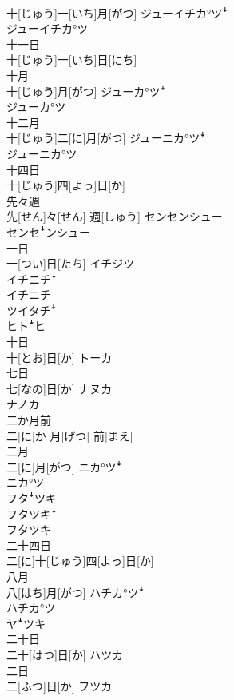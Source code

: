 \documentclass[8pt]{extreport}
\begin{document}
\begin{CJK}{UTF8}{min}
\\	十[じゅう]一[いち]月[がつ]	ジューイチカ°ツꜜ 
\\	ジューイチカ°ツ
\\	十一日	
\\	十[じゅう]一[いち]日[にち]	
\\	十月	
\\	十[じゅう]月[がつ]	ジューカ°ツꜜ 
\\	ジューカ°ツ
\\	十二月	
\\	十[じゅう]二[に]月[がつ]	ジューニカ°ツꜜ 
\\	ジューニカ°ツ
\\	十四日	
\\	十[じゅう]四[よっ]日[か]	
\\	先々週	
\\	先[せん]々[せん] 週[しゅう]	センセンシュー 
\\	センセꜜンシュー
\\	一日	
\\	一[つい]日[たち]	イチジツ 
\\	イチニチꜜ 
\\	イチニチ 
\\	ツイタチꜜ 
\\	ヒトꜜヒ
\\	十日	
\\	十[とお]日[か]	トーカ
\\	七日	
\\	七[なの]日[か]	ナヌカ 
\\	ナノカ
\\	二か月前	
\\	二[に]か 月[げつ] 前[まえ]	
\\	二月	
\\	二[に]月[がつ]	ニカ°ツꜜ 
\\	ニカ°ツ 
\\	フタꜜツキ 
\\	フタツキꜜ 
\\	フタツキ
\\	二十四日	
\\	二[に]十[じゅう]四[よっ]日[か]	
\\	八月	
\\	八[はち]月[がつ]	ハチカ°ツꜜ 
\\	ハチカ°ツ 
\\	ヤꜜツキ
\\	二十日	
\\	二十[はつ]日[か]	ハツカ
\\	二日	
\\	二[ふつ]日[か]	フツカ

\end{CJK}
\end{document}
